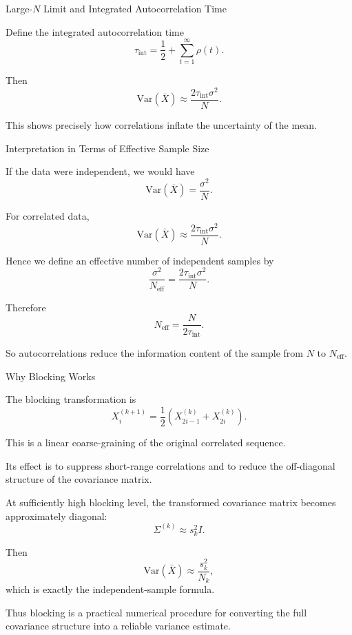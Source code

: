 \documentclass{beamer}
\begin{document}
\begin{frame}{Large-$N$ Limit and Integrated Autocorrelation Time}


Define the integrated autocorrelation time
\[
\tau_{\mathrm{int}}
=
\frac{1}{2}+\sum_{t=1}^{\infty}\rho(t).
\]

Then
\[
\mathrm{Var}(\bar X)
\approx
\frac{2\tau_{\mathrm{int}}\sigma^2}{N}.
\]

This shows precisely how correlations inflate the uncertainty of the mean.
\end{frame}



\begin{frame}{Interpretation in Terms of Effective Sample Size}

If the data were independent, we would have
\[
\mathrm{Var}(\bar X)=\frac{\sigma^2}{N}.
\]

For correlated data,
\[
\mathrm{Var}(\bar X)\approx \frac{2\tau_{\mathrm{int}}\sigma^2}{N}.
\]

Hence we define an effective number of independent samples by
\[
\frac{\sigma^2}{N_{\mathrm{eff}}}
=
\frac{2\tau_{\mathrm{int}}\sigma^2}{N}.
\]

Therefore
\[
N_{\mathrm{eff}}=\frac{N}{2\tau_{\mathrm{int}}}.
\]

So autocorrelations reduce the information content of the sample from $N$ to $N_{\mathrm{eff}}$.
\end{frame}

\begin{frame}{Why Blocking Works}

The blocking transformation is
\[
X_i^{(k+1)}=\frac{1}{2}\left(X_{2i-1}^{(k)}+X_{2i}^{(k)}\right).
\]

This is a linear coarse-graining of the original correlated sequence.

Its effect is to suppress short-range correlations and to reduce the off-diagonal structure of the covariance matrix.

At sufficiently high blocking level, the transformed covariance matrix becomes approximately diagonal:
\[
\Sigma^{(k)} \approx s_k^2 I.
\]

Then
\[
\mathrm{Var}(\bar X)
\approx \frac{s_k^2}{N_k},
\]
which is exactly the independent-sample formula.

Thus blocking is a practical numerical procedure for converting the full covariance structure into a reliable variance estimate.
\end{frame}
\end{document}
